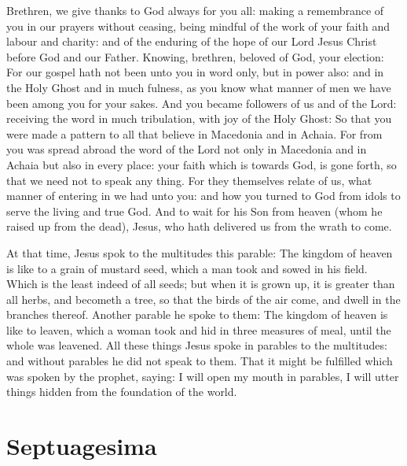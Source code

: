 \begin{multicols}{2}
Brethren, we give thanks to God always for you all: making a
remembrance of you in our prayers without ceasing, being mindful of the work of
your faith and labour and charity: and of the enduring of the hope of our Lord
Jesus Christ before God and our Father.  Knowing, brethren, beloved of God,
your election: For our gospel hath not been unto you in word only, but in power
also: and in the Holy Ghost and in much fulness, as you know what manner of men
we have been among you for your sakes.  And you became followers of us and of
the Lord: receiving the word in much tribulation, with joy of the Holy Ghost:
So that you were made a pattern to all that believe in Macedonia and in Achaia.
For from you was spread abroad the word of the Lord not only in Macedonia and
in Achaia but also in every place: your faith which is towards God, is gone
forth, so that we need not to speak any thing.  For they themselves relate of
us, what manner of entering in we had unto you: and how you turned to God from
idols to serve the living and true God.  And to wait for his Son from heaven
(whom he raised up from the dead), Jesus, who hath delivered us from the wrath
to come.



At that time, Jesus spok to the multitudes this parable: %
The kingdom of heaven is like to
a grain of mustard seed, which a man took and sowed in his field.  Which is the
least indeed of all seeds; but when it is grown up, it is greater than all
herbs, and becometh a tree, so that the birds of the air come, and dwell in the
branches thereof.  Another parable he spoke to them: The kingdom of heaven is
like to leaven, which a woman took and hid in three measures of meal, until the
whole was leavened.  All these things Jesus spoke in parables to the
multitudes: and without parables he did not speak to them.  That it might be
fulfilled which was spoken by the prophet, saying: I will open my mouth in
parables, I will utter things hidden from the foundation of the world.

\section{Septuagesima}




\end{multicols}
